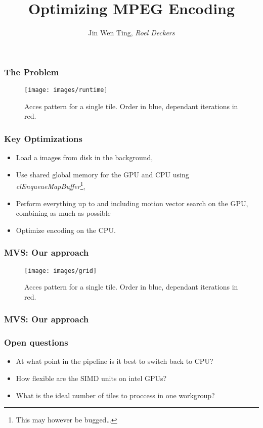 \documentclass{beamer}
\title{Optimizing MPEG Encoding}
\author{Jin Wen Ting, {\em Roel Deckers}}
\institute{Uppsala University}
\begin{document}
\begin{frame}
\titlepage
\end{frame}
\begin{frame}
  \frametitle{The Problem}
  \begin{figure}
  \texttt{[image: images/runtime]}
  \caption{Acces pattern for a single tile. Order in blue, dependant iterations in red.}
  \end{figure}
\end{frame}
\begin{frame}
  \frametitle{Key Optimizations}
  \begin{itemize}
    \item{Load a images from disk in the background,}
    \item{Use shared global memory for the GPU and CPU using {\em clEnqueueMapBuffer}\footnote{This may however be bugged\ldots},}
    \item{Perform everything up to and including motion vector search on the GPU, combining as much as possible}
    \item{Optimize encoding on the CPU.}
  \end{itemize}
\end{frame}

\begin{frame}
  \frametitle{MVS: Our approach}
  \begin{figure}
  \texttt{[image: images/grid]}
  \caption{Acces pattern for a single tile. Order in blue, dependant iterations in red.}
  \end{figure}
\end{frame}

\begin{frame}
  \frametitle{MVS: Our approach}
  \begin{itemize}
    \item{
  \end{itemize}
\end{frame}

\begin{frame}
  \frametitle{Open questions}
  \begin{itemize}
    \item{At what point in the pipeline is it best to switch back to CPU?}
    \item{How flexible are the SIMD units on intel GPUs?}
    \item{What is the ideal number of tiles to proccess in one workgroup?}
  \end{itemize}
\end{frame}
\end{document}

